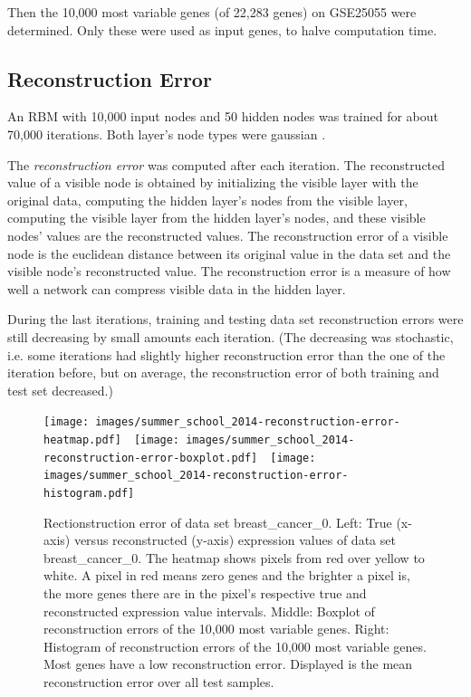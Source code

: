 Then the 10,000 most variable genes (of 22,283 genes) on GSE25055
were determined. Only these were used as input genes, to halve computation
time.

\subsection{Reconstruction Error}

An RBM with 10,000 input nodes and 50 hidden nodes was trained for
about 70,000 iterations. Both layer's node types were gaussian \cite{HintonSalakhutdinov2006}.

The \emph{reconstruction error} was computed
after each iteration. The reconstructed value of a visible node is
obtained by initializing the visible layer with the original data,
computing the hidden layer's nodes from the visible layer, computing
the visible layer from the hidden layer's nodes, and these visible
nodes' values are the reconstructed values. The reconstruction error
of a visible node is the euclidean distance between its original value
in the data set and the visible node's reconstructed value. The reconstruction
error is a measure of how well a network can compress visible data
in the hidden layer.

During the last iterations, training and testing data set reconstruction
errors were still decreasing by small amounts each iteration. (The
decreasing was stochastic, i.e. some iterations had slightly higher
reconstruction error than the one of the iteration before, but on
average, the reconstruction error of both training and test set decreased.) 

\begin{figure}
\begin{centering}
\texttt{[image: images/summer\_school\_2014-reconstruction-error-heatmap.pdf]}~~\texttt{[image: images/summer\_school\_2014-reconstruction-error-boxplot.pdf]}~~\texttt{[image: images/summer\_school\_2014-reconstruction-error-histogram.pdf]}
\par\end{centering}
\caption[Rectionstruction error of data set breast\_cancer\_0.]{\label{fig:Reconstruction-error-breast_cancer_0}Rectionstruction
error of data set breast\_cancer\_0. Left: True (x-axis) versus reconstructed
(y-axis) expression values of data set breast\_cancer\_0. The heatmap
shows pixels from red over yellow to white. A pixel in red means zero
genes and the brighter a pixel is, the more genes there are in the
pixel's respective true and reconstructed expression value intervals.
Middle: Boxplot of reconstruction errors of the 10,000 most variable
genes. Right: Histogram of reconstruction errors of the 10,000 most
variable genes. Most genes have a low reconstruction error. Displayed
is the mean reconstruction error over all test samples.}
\end{figure}

